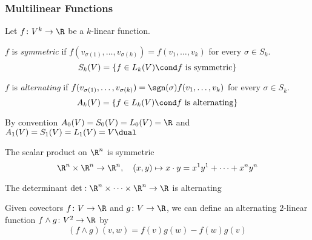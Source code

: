 \begin{frame}
  \frametitle{Multilinear Functions}
  Let $f \colon V^k \to \R$ be a $k$-linear function.
  \begin{defn}
    $f$ is {\em symmetric} if
    $f(v_{\sigma(1)}, \dots, v_{\sigma(k)}) = f(v_1, \dots, v_k)$
    for every $\sigma \in S_k$.
    \begin{displaymath}
      S_k(V) = \{f \in L_k(V) \cond \text{$f$ is symmetric}\}
    \end{displaymath}
  \end{defn}
  \begin{defn}
    $f$ is {\em alternating} if
    $f(v_{\sigma(1)}, \dots, v_{\sigma(k)}) = \sgn(\sigma) f(v_1, \dots, v_k)$
    for every $\sigma \in S_k$.
    \begin{displaymath}
      A_k(V) = \{f \in L_k(V) \cond \text{$f$ is alternating}\}
    \end{displaymath}
  \end{defn}
  By convention $A_0(V) = S_0(V) = L_0(V) = \R$ and $A_1(V) = S_1(V) = L_1(V) =
  V\dual$
\end{frame}
\begin{frame}
  \begin{example}
    The scalar product on $\R^n$ is symmetric
    \begin{displaymath}
      \R^n \times \R^n \to \R^n, \quad (x, y) \mapsto x \cdot y = x^1 y^1 + \dots
      + x^n y^n
    \end{displaymath}
  \end{example}
  \begin{example}
    The determinant $\det: \R^n \times \dots \times \R^n \to \R$ is alternating
  \end{example}
  \begin{example}
    Given covectors $f \colon V \to \R$ and $g \colon V \to \R$, we can define 
    an alternating $2$-linear function $f \wedge g \colon V^2 \to \R$ by
    \begin{displaymath}
      (f \wedge g)(v, w) = f(v)g(w) - f(w) g(v)
    \end{displaymath}
  \end{example}
\end{frame}
